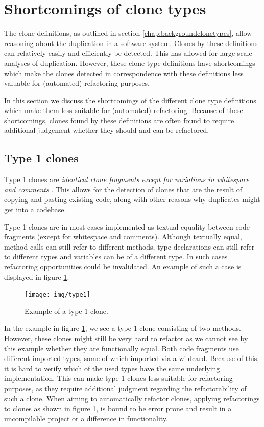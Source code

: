 \documentclass[a4paper]{article}
\begin{document}
\section{Shortcomings of clone types}
The clone definitions, as outlined in section \ref{chap:backgroundclonetypes}, allow reasoning about the duplication in a software system. Clones by these definitions can relatively easily and efficiently be detected. This has allowed for large scale analyses of duplication. However, these clone type definitions have shortcomings which make the clones detected in correspondence with these definitions less valuable for (automated) refactoring purposes.

In this section we discuss the shortcomings of the different clone type definitions which make them less suitable for (automated) refactoring. Because of these shortcomings, clones found by these definitions are often found to require additional judgement whether they should and can be refactored.

\subsection{Type 1 clones} \label{chap:type1clones}
Type 1 clones are \textit{identical clone fragments except for variations in whitespace and comments} \cite{roy2007survey}. This allows for the detection of clones that are the result of copying and pasting existing code, along with other reasons why duplicates might get into a codebase.

Type 1 clones are in most cases implemented as textual equality between code fragments (except for whitespace and comments). Although textually equal, method calls can still refer to different methods, type declarations can still refer to different types and variables can be of a different type. In such cases refactoring opportunities could be invalidated. An example of such a case is displayed in figure \ref{fig:type1}.

\begin{figure}[H]
  \texttt{[image: img/type1]}
  \caption{Example of a type 1 clone.}
  \label{fig:type1}
\end{figure}

In the example in figure \ref{fig:type1}, we see a type 1 clone consisting of two methods. However, these clones might still be very hard to refactor as we cannot see by this example whether they are functionally equal. Both code fragments use different imported types, some of which imported via a wildcard. Because of this, it is hard to verify which of the used types have the same underlying implementation. This can make type 1 clones less suitable for refactoring purposes, as they require additional judgment regarding the refactorability of such a clone. When aiming to automatically refactor clones, applying refactorings to clones as shown in figure \ref{fig:type1}, is bound to be error prone and result in a uncompilable project or a difference in functionality.
\end{document}
